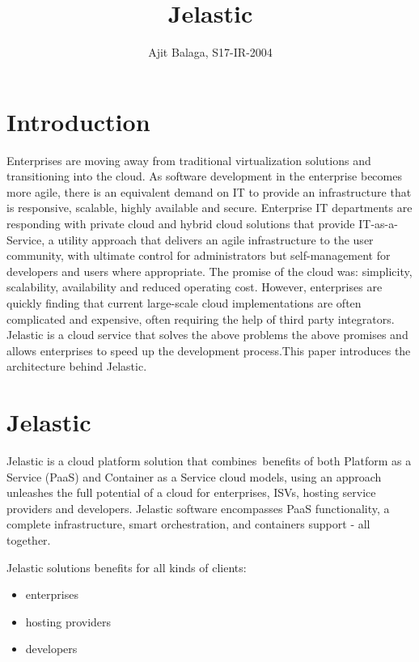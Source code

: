 \documentclass[9pt,twocolumn,twoside]{../../styles/osajnl}
\title{Jelastic}
\author[1]{Ajit Balaga, S17-IR-2004}
\affil[1]{School of Informatics and Computing, Bloomington, IN 47408, U.S.A.}
\affil[*]{Corresponding authors: abalaga@iu.edu, ajit.balaga@gmail.com}
\begin{document}
\maketitle

\section{Introduction}
Enterprises are moving away from traditional virtualization solutions and 
transitioning into the cloud. As software development in the enterprise becomes 
more agile, there is an equivalent demand on IT to provide an infrastructure 
that is responsive, scalable, highly available and secure. Enterprise IT 
departments are responding with private cloud and hybrid cloud solutions that 
provide IT-as-a-Service, a utility approach that delivers an agile 
infrastructure to the user community, with ultimate control for administrators 
but self-management for developers and users where appropriate. The promise of 
the cloud was: simplicity, scalability, availability and reduced operating cost. 
However, enterprises are quickly finding that current large-scale cloud 
implementations are often complicated and expensive, often requiring the help of 
third party integrators. Jelastic is a cloud service that solves the above 
problems the above promises and allows enterprises to speed up the development 
process.This paper introduces the architecture behind Jelastic.\cite{www-jelastic6}

\section{Jelastic}
Jelastic is a cloud platform solution that combines benefits of both Platform as
a Service (PaaS) and Container as a Service cloud models, using an approach
unleashes the full potential of a cloud for enterprises, ISVs, hosting service
providers and developers. Jelastic software encompasses PaaS functionality, a
complete infrastructure, smart orchestration, and containers support - all
together.\cite{www-jelastic1}

Jelastic solutions benefits for all kinds of clients:
\begin{itemize}
\renewcommand{\labelitemi}{\scriptsize$\square$}
\item enterprises
\item hosting providers
\item developers
\end{itemize}\cite{www-jelastic1}
\end{document}
